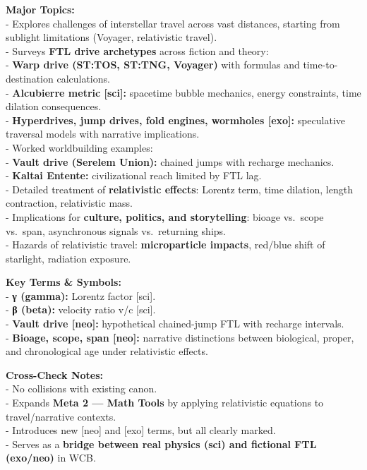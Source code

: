 \documentclass[
  letterpaper,
]{book}
\begin{document}
\textbf{Major Topics:}\\
- Explores challenges of interstellar travel across vast distances,
starting from sublight limitations (Voyager, relativistic travel).\\
- Surveys \textbf{FTL drive archetypes} across fiction and theory:\\
- \textbf{Warp drive (ST:TOS, ST:TNG, Voyager)} with formulas and
time-to-destination calculations.\\
- \textbf{Alcubierre metric {[}sci{]}:} spacetime bubble mechanics,
energy constraints, time dilation consequences.\\
- \textbf{Hyperdrives, jump drives, fold engines, wormholes {[}exo{]}:}
speculative traversal models with narrative implications.\\
- Worked worldbuilding examples:\\
- \textbf{Vault drive (Serelem Union):} chained jumps with recharge
mechanics.\\
- \textbf{Kaltai Entente:} civilizational reach limited by FTL lag.\\
- Detailed treatment of \textbf{relativistic effects}: Lorentz term,
time dilation, length contraction, relativistic mass.\\
- Implications for \textbf{culture, politics, and storytelling}: bioage
vs.~scope vs.~span, asynchronous signals vs.~returning ships.\\
- Hazards of relativistic travel: \textbf{microparticle impacts},
red/blue shift of starlight, radiation exposure.

\textbf{Key Terms \& Symbols:}\\
- \textbf{γ (gamma):} Lorentz factor {[}sci{]}.\\
- \textbf{β (beta):} velocity ratio v/c {[}sci{]}.\\
- \textbf{Vault drive {[}neo{]}:} hypothetical chained-jump FTL with
recharge intervals.\\
- \textbf{Bioage, scope, span {[}neo{]}:} narrative distinctions between
biological, proper, and chronological age under relativistic effects.

\textbf{Cross-Check Notes:}\\
- No collisions with existing canon.\\
- Expands \textbf{Meta 2 --- Math Tools} by applying relativistic
equations to travel/narrative contexts.\\
- Introduces new {[}neo{]} and {[}exo{]} terms, but all clearly
marked.\\
- Serves as a \textbf{bridge between real physics (sci) and fictional
FTL (exo/neo)} in WCB.
\end{document}
